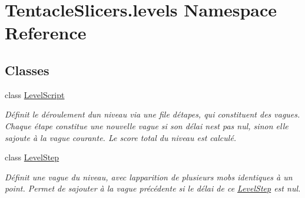 \hypertarget{namespace_tentacle_slicers_1_1levels}{}\section{Tentacle\+Slicers.\+levels Namespace Reference}
\label{namespace_tentacle_slicers_1_1levels}
\subsection*{Classes}
\begin{DoxyCompactItemize}
\item 
class \hyperlink{class_tentacle_slicers_1_1levels_1_1_level_script}{Level\+Script}
\begin{DoxyCompactList}\small\item\em Définit le déroulement d\textquotesingle{}un niveau via une file d\textquotesingle{}étapes, qui constituent des vagues. Chaque étape constitue une nouvelle vague si son délai n\textquotesingle{}est pas nul, sinon elle s\textquotesingle{}ajoute à la vague courante. Le score total du niveau est calculé. \end{DoxyCompactList}\item 
class \hyperlink{class_tentacle_slicers_1_1levels_1_1_level_step}{Level\+Step}
\begin{DoxyCompactList}\small\item\em Définit une vague du niveau, avec l\textquotesingle{}apparition de plusieurs mobs identiques à un point. Permet de s\textquotesingle{}ajouter à la vague précédente si le délai de ce \hyperlink{class_tentacle_slicers_1_1levels_1_1_level_step}{Level\+Step} est nul. \end{DoxyCompactList}\end{DoxyCompactItemize}
